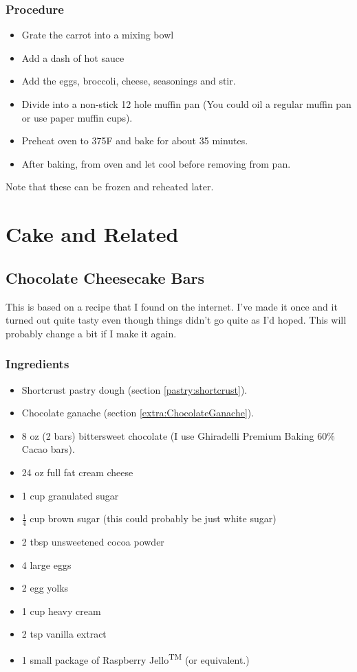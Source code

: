 \documentclass[10pt, openany]{book}
\begin{document}
\subsection{Procedure}
\begin{itemize}
  \item Grate the carrot into a mixing bowl
  \item Add a dash of hot sauce
  \item Add the eggs, broccoli, cheese, seasonings and stir.
  \item Divide into a non-stick 12 hole muffin pan (You could oil a regular muffin pan or use paper muffin cups).
  \item Preheat oven to 375\degree{}F and bake for about 35 minutes.
  \item After baking, from oven and let cool before removing from pan.
\end{itemize}

Note that these can be frozen and reheated later.

\chapter{Cake and Related}
\section{Chocolate Cheesecake Bars}
This is based on a recipe that I found on the internet.  I've made it once and it turned out quite tasty even though things didn't go quite as I'd hoped.  This will probably change a bit if I make it again.
\subsection{Ingredients}
\begin{itemize}
  \item Shortcrust pastry dough (section \ref{pastry:shortcrust}).
  \item Chocolate ganache (section \ref{extra:ChocolateGanache}).
  \item 8 oz (2 bars) bittersweet chocolate (I use Ghiradelli Premium Baking 60\% Cacao bars).
  \item 24 oz full fat cream cheese
  \item 1 cup granulated sugar
  \item $\frac{1}{4}$ cup brown sugar (this could probably be just white sugar)
  \item 2 tbsp unsweetened cocoa powder
  \item 4 large eggs
  \item 2 egg yolks
  \item 1 cup heavy cream
  \item 2 tsp vanilla extract
  \item 1 small package of Raspberry Jello\textsuperscript{TM} (or equivalent.)
\end{itemize}
\end{document}
